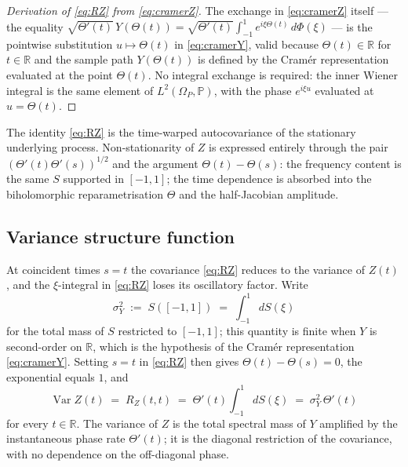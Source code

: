 \documentclass[11pt]{article}
\DeclareMathOperator{\Var}{Var}
\begin{document}
\begin{proof}[Derivation of \eqref{eq:RZ} from \eqref{eq:cramerZ}]
The exchange in \eqref{eq:cramerZ} itself --- the equality $\sqrt{\Theta'(t)}\,Y(\Theta(t)) = \sqrt{\Theta'(t)}\int_{-1}^{1} e^{i\xi\Theta(t)}\,d\Phi(\xi)$ --- is the pointwise substitution $u\mapsto\Theta(t)$ in \eqref{eq:cramerY}, valid because $\Theta(t)\in\mathbb{R}$ for $t\in\mathbb{R}$ and the sample path $Y(\Theta(t))$ is defined by the Cram\'er representation evaluated at the point $\Theta(t)$. No integral exchange is required: the inner Wiener integral is the same element of $L^2(\Omega_P,\mathbb{P})$, with the phase $e^{i\xi u}$ evaluated at $u=\Theta(t)$.
\end{proof}

The identity \eqref{eq:RZ} is the time-warped autocovariance of the stationary underlying process. Non-stationarity of $Z$ is expressed entirely through the pair $(\Theta'(t)\Theta'(s))^{1/2}$ and the argument $\Theta(t)-\Theta(s)$: the frequency content is the same $S$ supported in $[-1,1]$; the time dependence is absorbed into the biholomorphic reparametrisation $\Theta$ and the half-Jacobian amplitude.

\subsection{Variance structure function}\label{app:varstruct}

At coincident times $s=t$ the covariance \eqref{eq:RZ} reduces to the variance of $Z(t)$, and the $\xi$-integral in \eqref{eq:RZ} loses its oscillatory factor. Write
\begin{equation}\label{eq:sigmaYdef}
\sigma_Y^2 \;:=\; S([-1,1]) \;=\; \int_{-1}^{1}dS(\xi)
\end{equation}
for the total mass of $S$ restricted to $[-1,1]$; this quantity is finite when $Y$ is second-order on $\mathbb{R}$, which is the hypothesis of the Cram\'er representation \eqref{eq:cramerY}. Setting $s=t$ in \eqref{eq:RZ} then gives $\Theta(t)-\Theta(s)=0$, the exponential equals $1$, and
\begin{equation}\label{eq:varZ}
\Var Z(t) \;=\; R_Z(t,t) \;=\; \Theta'(t)\int_{-1}^{1}dS(\xi) \;=\; \sigma_Y^2\,\Theta'(t)
\end{equation}
for every $t\in\mathbb{R}$. The variance of $Z$ is the total spectral mass of $Y$ amplified by the instantaneous phase rate $\Theta'(t)$; it is the diagonal restriction of the covariance, with no dependence on the off-diagonal phase.
\end{document}
